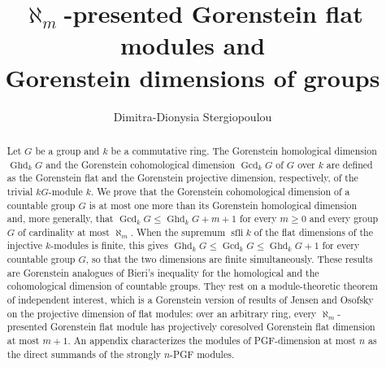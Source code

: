 \documentclass[12pt]{amsart}
\theoremstyle{remark}
\theoremstyle{definition}
\theoremstyle{plain}
\DeclareMathOperator{\Ghd}{Ghd}
\DeclareMathOperator{\Gcd}{Gcd}
\DeclareMathOperator{\sfli}{sfli}
\newcommand{\alephm}{\aleph_m}
\begin{document}
\title[$\alephm$-presented Gorenstein flat modules and Gorenstein dimensions of groups]{$\alephm$-presented Gorenstein flat modules and\\ Gorenstein dimensions of groups}
\author{Dimitra-Dionysia Stergiopoulou}
\address{Department of Mathematics, University of Thessaly, Lamia, Greece}

\begin{abstract}
Let $G$ be a group and $k$ be a commutative ring. The Gorenstein homological dimension $\Ghd_kG$ and the Gorenstein cohomological dimension $\Gcd_kG$ of  $G$ over $k$ are defined as the Gorenstein flat and the Gorenstein projective dimension, respectively, of the trivial $kG$-module $k$. We prove that the Gorenstein cohomological dimension of a countable group $G$ is at most one more than its Gorenstein homological dimension and, more generally, that $\Gcd_kG\le\Ghd_kG+m+1$ for every $m\ge0$ and every group $G$ of cardinality at most $\aleph_m$. When the supremum $\sfli k$ of the flat dimensions of the injective $k$-modules is finite, this gives $\Ghd_kG\le\Gcd_kG\le\Ghd_kG+1$ for every countable group $G$, so that the two dimensions are finite simultaneously. These results are Gorenstein analogues of Bieri's inequality for the homological and the cohomological dimension of countable groups. They rest on a module-theoretic theorem of independent interest, which is a Gorenstein version of results of Jensen and Osofsky on the projective dimension of flat modules: over an arbitrary ring, every $\aleph_m$-presented Gorenstein flat module has projectively coresolved Gorenstein flat dimension at most $m+1$. An appendix characterizes the modules of PGF-dimension at most $n$ as the direct summands of the strongly $n$-PGF modules. 
\end{abstract}

\renewcommand{\subjclassname}{%
  \textup{2020} Mathematics Subject Classification}
\maketitle
\end{document}
